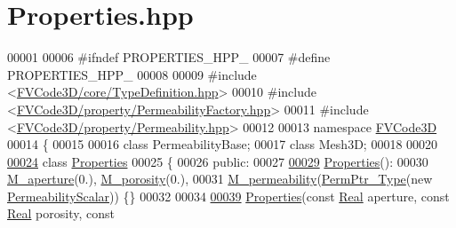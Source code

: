 \hypertarget{Properties_8hpp_source}{}\section{Properties.\+hpp}
\label{Properties_8hpp_source}

\begin{DoxyCode}
00001 
00006 \textcolor{preprocessor}{#ifndef PROPERTIES\_HPP\_}
00007 \textcolor{preprocessor}{#define PROPERTIES\_HPP\_}
00008 
00009 \textcolor{preprocessor}{#include <\hyperlink{TypeDefinition_8hpp}{FVCode3D/core/TypeDefinition.hpp}>}
00010 \textcolor{preprocessor}{#include <\hyperlink{PermeabilityFactory_8hpp}{FVCode3D/property/PermeabilityFactory.hpp}>}
00011 \textcolor{preprocessor}{#include <\hyperlink{Permeability_8hpp}{FVCode3D/property/Permeability.hpp}>}
00012 
00013 \textcolor{keyword}{namespace }\hyperlink{namespaceFVCode3D}{FVCode3D}
00014 \{
00015 
00016 \textcolor{keyword}{class }PermeabilityBase;
00017 \textcolor{keyword}{class }Mesh3D;
00018 
00020 
\hypertarget{Properties_8hpp_source.tex_l00024}{}\hyperlink{classFVCode3D_1_1Properties}{00024} \textcolor{keyword}{class }\hyperlink{classFVCode3D_1_1Properties}{Properties}
00025 \{
00026 \textcolor{keyword}{public}:
00027 
\hypertarget{Properties_8hpp_source.tex_l00029}{}\hyperlink{classFVCode3D_1_1Properties_a6973ad7404c3bcb871fa9b9d5ea0fdfe}{00029}     \hyperlink{classFVCode3D_1_1Properties_a6973ad7404c3bcb871fa9b9d5ea0fdfe}{Properties}():
00030         \hyperlink{classFVCode3D_1_1Properties_ace95facc126d88b414622cdb0e4fc835}{M\_aperture}(0.), \hyperlink{classFVCode3D_1_1Properties_a22632d3f1cb4769e409c6d3bc84893d8}{M\_porosity}(0.),
00031         \hyperlink{classFVCode3D_1_1Properties_a0689b2e6e4e5cb23ba4553ac78abe2bd}{M\_permeability}(\hyperlink{namespaceFVCode3D_aee5ae48a57366603109f90f526a645b1}{PermPtr\_Type}(new 
      \hyperlink{classFVCode3D_1_1PermeabilityScalar}{PermeabilityScalar})) \{\}
00032 
00034 
\hypertarget{Properties_8hpp_source.tex_l00039}{}\hyperlink{classFVCode3D_1_1Properties_a36e262d7a5f3d3b891fd5b3b2d6ecd42}{00039}     \hyperlink{classFVCode3D_1_1Properties_a36e262d7a5f3d3b891fd5b3b2d6ecd42}{Properties}(\textcolor{keyword}{const} \hyperlink{namespaceFVCode3D_a40c1f5588a248569d80aa5f867080e83}{Real} aperture, \textcolor{keyword}{const} \hyperlink{namespaceFVCode3D_a40c1f5588a248569d80aa5f867080e83}{Real} porosity, \textcolor{keyword}{const} 

\end{DoxyCode}
